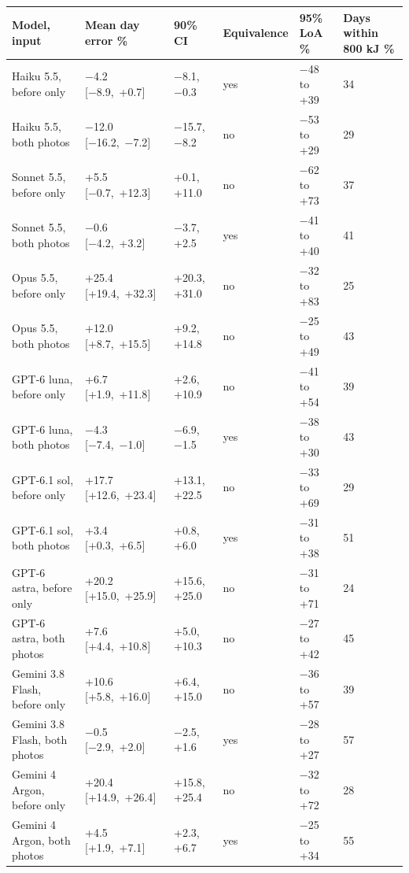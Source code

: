 \documentclass[
  11pt,
  letterpaper]{article}
\newcounter{none} %
\begin{document}
{\def\LTcaptype{none} %
\begin{longtable}[]{@{}llllll@{}}
\toprule\noalign{}
Model, input & Mean day error \% & 90\% CI & Equivalence & 95\% LoA \% & Days within 800 kJ \% \\
\midrule\noalign{}
\endhead
\bottomrule\noalign{}
\endlastfoot
Haiku 5.5, before only & −4.2 {[}−8.9,~+0.7{]} & −8.1, −0.3 & yes & −48 to +39 & 34 \\
Haiku 5.5, both photos & −12.0 {[}−16.2,~−7.2{]} & −15.7, −8.2 & no & −53 to +29 & 29 \\
Sonnet 5.5, before only & +5.5 {[}−0.7,~+12.3{]} & +0.1, +11.0 & no & −62 to +73 & 37 \\
Sonnet 5.5, both photos & −0.6 {[}−4.2,~+3.2{]} & −3.7, +2.5 & yes & −41 to +40 & 41 \\
Opus 5.5, before only & +25.4 {[}+19.4,~+32.3{]} & +20.3, +31.0 & no & −32 to +83 & 25 \\
Opus 5.5, both photos & +12.0 {[}+8.7,~+15.5{]} & +9.2, +14.8 & no & −25 to +49 & 43 \\
GPT-6 luna, before only & +6.7 {[}+1.9,~+11.8{]} & +2.6, +10.9 & no & −41 to +54 & 39 \\
GPT-6 luna, both photos & −4.3 {[}−7.4,~−1.0{]} & −6.9, −1.5 & yes & −38 to +30 & 43 \\
GPT-6.1 sol, before only & +17.7 {[}+12.6,~+23.4{]} & +13.1, +22.5 & no & −33 to +69 & 29 \\
GPT-6.1 sol, both photos & +3.4 {[}+0.3,~+6.5{]} & +0.8, +6.0 & yes & −31 to +38 & 51 \\
GPT-6 astra, before only & +20.2 {[}+15.0,~+25.9{]} & +15.6, +25.0 & no & −31 to +71 & 24 \\
GPT-6 astra, both photos & +7.6 {[}+4.4,~+10.8{]} & +5.0, +10.3 & no & −27 to +42 & 45 \\
Gemini 3.8 Flash, before only & +10.6 {[}+5.8,~+16.0{]} & +6.4, +15.0 & no & −36 to +57 & 39 \\
Gemini 3.8 Flash, both photos & −0.5 {[}−2.9,~+2.0{]} & −2.5, +1.6 & yes & −28 to +27 & 57 \\
Gemini 4 Argon, before only & +20.4 {[}+14.9,~+26.4{]} & +15.8, +25.4 & no & −32 to +72 & 28 \\
Gemini 4 Argon, both photos & +4.5 {[}+1.9,~+7.1{]} & +2.3, +6.7 & yes & −25 to +34 & 55 \\
\end{longtable}
}
\end{document}
